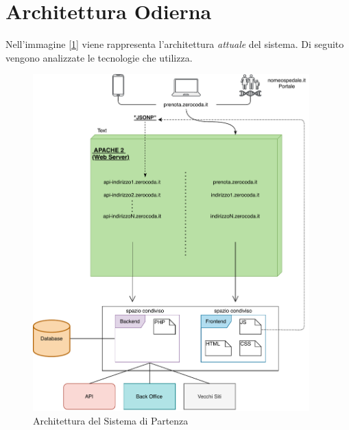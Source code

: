 \section{Architettura Odierna}
Nell'immagine [\ref{fig:oldarchitecture}] viene rappresenta l'architettura \emph{attuale} del sistema. Di seguito vengono analizzate le tecnologie che utilizza.
\begin{figure}[H]
    \centering
    \includegraphics[width=0.95\textwidth]{images/02_4_old_architecture.pdf}
    \caption{Architettura del Sistema di Partenza}
    \label{fig:oldarchitecture}
\end{figure}

